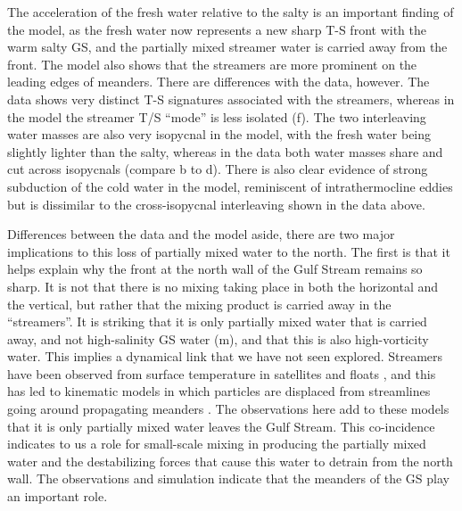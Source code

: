 \documentclass{natureJMK}
\begin{document}
The acceleration of the fresh water relative to the salty is an important finding of the model, as the fresh water now represents a new sharp T-S front with the warm salty GS, and the partially mixed streamer water is carried away from the front.  The model also shows that the streamers are more prominent on the leading edges of meanders.  There are differences with the data, however.  The data shows very distinct T-S signatures associated with the streamers, whereas in the model the streamer T/S ``mode'' is less isolated (f).  The two interleaving water masses are also very isopycnal in the model, with the fresh water being slightly lighter than the salty, whereas in the data both water masses  share and cut across isopycnals (compare b to d).   There is also clear evidence of strong subduction of the cold water in the model, reminiscent of intrathermocline eddies \cite{thomasjoyce10} but is dissimilar to the cross-isopycnal interleaving shown in the data above.    

Differences between the data and the model aside, there are two major implications to this loss of partially mixed water to the north.  The first is that it helps explain why the front at the north wall of the Gulf Stream remains so sharp.  It is not that there is no mixing taking place in both the horizontal and the vertical, but rather that the mixing product is carried away in the ``streamers''.  It is striking that it is only partially mixed water that is carried away, and not high-salinity GS water (m), and that this is also high-vorticity water.  This implies a dynamical link that we have not seen explored.  Streamers have been observed from surface temperature in satellites and floats \cite{bowerrossby89,flierletal87,lozieretal97 ,songetal95}, and this has led to kinematic models in which particles are displaced from streamlines going around propagating meanders \cite{bower91,prattetal95,lozieretal97}. The observations here add to these models that it is only partially mixed water leaves the Gulf Stream.  This co-incidence indicates to us a role for small-scale mixing in producing the partially mixed water and the destabilizing forces that cause this water to detrain from the north wall.  The observations and simulation indicate that the meanders of the GS play an important role.  
\end{document}
